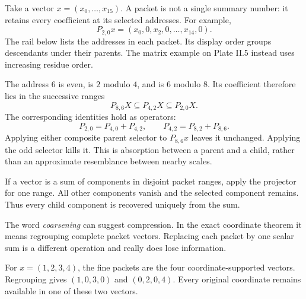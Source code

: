 Take a vector $x=(x_0,\ldots,x_{15})$. A packet is not a single summary number: it retains every coefficient at its selected addresses. For example,
\[
P_{2,0}x=(x_0,0,x_2,0,\ldots,x_{14},0).
\]
The rail below lists the addresses in each packet. Its display order groups descendants under their parents. The matrix example on Plate II.5 instead uses increasing residue order.


The address $6$ is even, is $2$ modulo $4$, and is $6$ modulo $8$. Its coefficient therefore lies in the successive ranges
\[
P_{8,6}X\subseteq P_{4,2}X\subseteq P_{2,0}X.
\]
The corresponding identities hold as operators:
\[
P_{2,0}=P_{4,0}+P_{4,2},\qquad
P_{4,2}=P_{8,2}+P_{8,6}.
\]
Applying either composite parent selector to $P_{8,6}x$ leaves it unchanged. Applying the odd selector kills it. This is absorption between a parent and a child, rather than an approximate resemblance between nearby scales.

If a vector is a sum of components in disjoint packet ranges, apply the projector for one range. All other components vanish and the selected component remains. Thus every child component is recovered uniquely from the sum.


The word \emph{coarsening} can suggest compression. In the exact coordinate theorem it means regrouping complete packet vectors. Replacing each packet by one scalar sum is a different operation and really does lose information.

For $x=(1,2,3,4)$, the fine packets are the four coordinate-supported vectors. Regrouping gives $(1,0,3,0)$ and $(0,2,0,4)$. Every original coordinate remains available in one of these two vectors.


